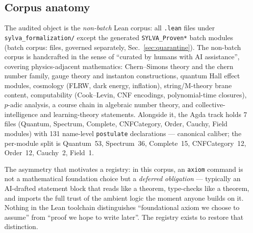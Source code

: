 
\subsection{Corpus anatomy}
\label{sec:corpus}
The audited object is the \emph{non-batch} Lean corpus: all
\texttt{.lean} files under \texttt{sylva\_formalization/} except
the generated \texttt{SYLVA\_Proven*} batch modules (batch corpus:
 files, governed separately,
Sec.~\ref{sec:quarantine}). The non-batch corpus is handcrafted in
the sense of ``curated by humans with AI assistance'', covering
physics-adjacent mathematics: Chern--Simons theory and the chern
number family, gauge theory and instanton constructions, quantum
Hall effect modules, cosmology (FLRW, dark energy, inflation),
string/M-theory brane content, computability (Cook--Levin, CNF
encodings, polynomial-time closures), $p$-adic analysis, a course
chain in algebraic number theory, and collective-intelligence and
learning-theory statements. Alongside it, the Agda track holds 7
files (Quantum, Spectrum, Complete, CNFCategory, Order, Cauchy,
Field modules) with 131 name-level \texttt{postulate} declarations
--- canonical caliber; the per-module split is Quantum~53,
Spectrum~36, Complete~15, CNFCategory~12, Order~12, Cauchy~2,
Field~1.

The asymmetry that motivates a registry: in this corpus, an
\texttt{axiom} command is not a mathematical foundation choice but
a \emph{deferred obligation} --- typically an AI-drafted statement
block that reads like a theorem, type-checks like a theorem, and
imports the full trust of the ambient logic the moment anyone builds
on it. Nothing in the Lean toolchain distinguishes ``foundational
axiom we choose to assume'' from ``proof we hope to write later''.
The registry exists to restore that distinction.

